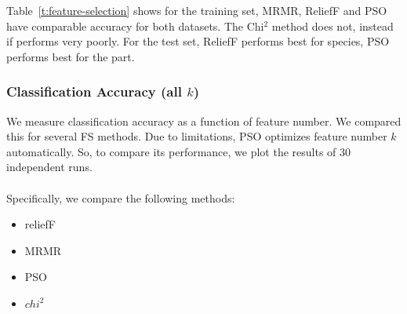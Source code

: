 \documentclass{article}
\begin{document}
Table~\ref{t:feature-selection} shows for the training set, MRMR, ReliefF and PSO have comparable accuracy for both datasets.
The Chi$^2$ method does not, instead if performs very poorly.
For the test set, ReliefF performs best for species, PSO performs best for the part.

\subsubsection{Classification Accuracy (all $k$)}

We measure classification accuracy as a function of feature number.
We compared this for several FS methods.
Due to limitations, PSO optimizes feature number $k$ automatically.
So, to compare its performance, we plot the results of 30 independent runs.
\\\\
Specifically, we compare the following methods:

\begin{itemize}
  \item reliefF \cite{aizerman1964theoretical}
  \item MRMR \cite{ding2005minimum}
  \item PSO \cite{kennedy1995particle,kennedy1997discrete}
  \item $chi^2$ \cite{liu1995chi2}
\end{itemize}
\end{document}

